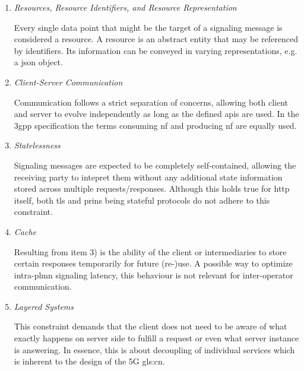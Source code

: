 \begin{enumerate}[label=\arabic*), wide, labelwidth=!, labelindent=0pt]
    \item \textit{Resources, Resource Identifiers, and Resource Representation}

    \noindent
    Every single data point that might be the target of a signaling message is considered a resource.
    A resource is an abstract entity that may be referenced by identifiers.
    Its information can be conveyed in varying representations, e.g. a \gls{json} object.

    \item \textit{Client-Server Communication}

    \noindent
    Communication follows a strict separation of concerns, allowing both client and server to evolve independently as long as the defined \glspl{api} are used.
    In the \gls{3gpp} specification the terms consuming \gls{nf} and producing \gls{nf} are equally used.

    \item \textit{Statelessness}

    \noindent
    Signaling messages are expected to be completely self-contained, allowing the receiving party to intepret them without any additional state information stored across multiple requests/responses.
    Although this holds true for \gls{http} itself, both \gls{tls} and \gls{prins} being stateful protocols do not adhere to this constraint.

    \item \textit{Cache}

    \noindent
    Resulting from item 3) is the ability of the client or intermediaries to store certain responses temporarily for future (re-)use.
    A possible way to optimize intra-\gls{plmn} signaling latency, this behaviour is not relevant for inter-operator communication.

    \item \textit{Layered Systems}

    \noindent
    This constraint demands that the client does not need to be aware of what exactly happens on server side to fulfill a request or even what server instance is answering.
    In essence, this is about decoupling of individual services which is inherent to the design of the 5G \gls{gls:cn}.

\end{enumerate}

